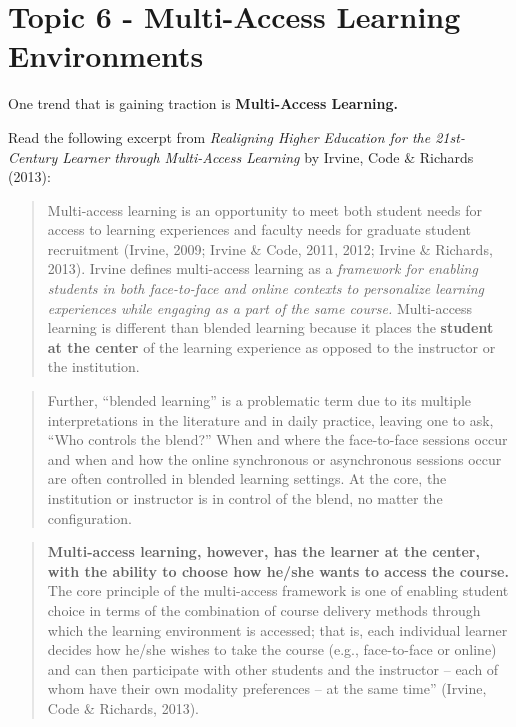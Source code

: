 \documentclass[
]{book}
\begin{document}
\hypertarget{topic-6---multi-access-learning-environments}{%
\section*{Topic 6 - Multi-Access Learning Environments}\label{topic-6---multi-access-learning-environments}}

One trend that is gaining traction is \textbf{Multi-Access Learning.}

Read the following excerpt from \emph{Realigning Higher Education for the 21st-Century Learner through Multi-Access Learning} by Irvine, Code \& Richards (2013):

\begin{quote}
Multi-access learning is an opportunity to meet both student needs for access to learning experiences and faculty needs for graduate student recruitment (Irvine, 2009; Irvine \& Code, 2011, 2012; Irvine \& Richards, 2013). Irvine defines multi-access learning as a \emph{framework for enabling students in both face-to-face and online contexts to personalize learning experiences while engaging as a part of the same course.} Multi-access learning is different than blended learning because it places the \textbf{student at the center} of the learning experience as opposed to the instructor or the institution.
\end{quote}

\begin{quote}
Further, ``blended learning'' is a problematic term due to its multiple interpretations in the literature and in daily practice, leaving one to ask, ``Who controls the blend?'' When and where the face-to-face sessions occur and when and how the online synchronous or asynchronous sessions occur are often controlled in blended learning settings. At the core, the institution or instructor is in control of the blend, no matter the configuration.
\end{quote}

\begin{quote}
\textbf{Multi-access learning, however, has the learner at the center, with the ability to choose how he/she wants to access the course.} The core principle of the multi-access framework is one of enabling student choice in terms of the combination of course delivery methods through which the learning environment is accessed; that is, each individual learner decides how he/she wishes to take the course (e.g., face-to-face or online) and can then participate with other students and the instructor -- each of whom have their own modality preferences -- at the same time'' (Irvine, Code \& Richards, 2013).
\end{quote}
\end{document}
